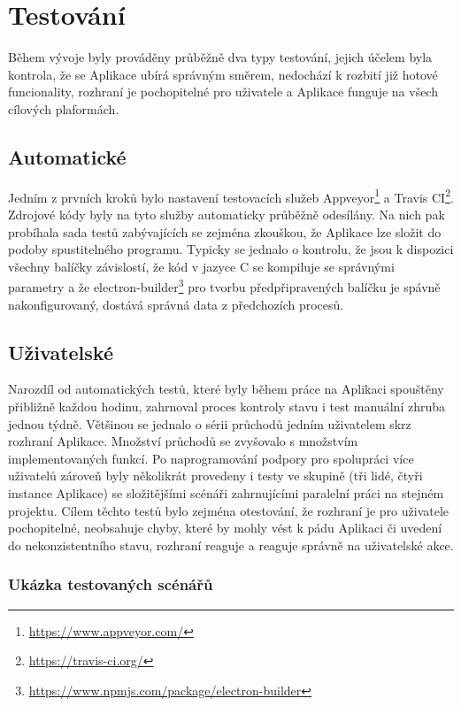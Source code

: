 \chapter{Testování}

Během vývoje byly prováděny průběžně dva typy testování, jejich účelem byla kontrola, že se Aplikace ubírá správným směrem, nedochází k rozbití již hotové funcionality, rozhraní je pochopitelné pro uživatele a Aplikace funguje na všech cílových plaformách.

\section{Automatické}

Jedním z prvních kroků bylo nastavení testovacích služeb Appveyor\footnote{\url{https://www.appveyor.com/}} a Travis CI\footnote{\url{https://travis-ci.org/}}. Zdrojové kódy byly na tyto služby automaticky průběžně odesílány. Na nich pak probíhala sada testů zabývajících se zejména zkouškou, že Aplikace lze složit do podoby spustitelného programu. Typicky se jednalo o kontrolu, že jsou k dispozici všechny balíčky závislostí, že kód v jazyce C se kompiluje se správnými parametry a že electron-builder\footnote{\url{https://www.npmjs.com/package/electron-builder}} pro tvorbu předpřipravených balíčku je spávně nakonfigurovaný, dostává správná data z předchozích procesů.

\section{Uživatelské}

Narozdíl od automatických testů, které byly během práce na Aplikaci spouštěny přibližně každou hodinu, zahrnoval proces kontroly stavu i test manuální zhruba jednou týdně. Většinou se jednalo o sérii průchodů jedním uživatelem skrz rozhraní Aplikace. Množství průchodů se zvyšovalo s množstvím implementovaných funkcí. Po naprogramování podpory pro spolupráci více uživatelů zároveň byly několikrát provedeny i testy ve skupině (tři lidé, čtyři instance Aplikace) se složitějšími scénáři zahrnujícími paralelní práci na stejném projektu. Cílem těchto testů bylo zejména otestování, že rozhraní je pro uživatele pochopitelné, neobsahuje chyby, které by mohly vést k pádu Aplikaci či uvedení do nekonzistentního stavu, rozhraní reaguje a reaguje správně na uživatelské akce.

\subsection{Ukázka testovaných scénářů}

